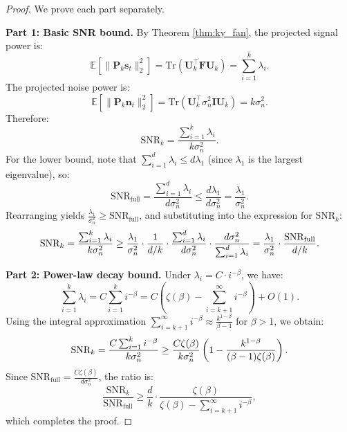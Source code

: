 ﻿\documentclass[lettersize,journal]{IEEEtran}
\begin{document}
\begin{proof}
We prove each part separately.

\textbf{Part 1: Basic SNR bound.} By Theorem \ref{thm:ky_fan}, the projected signal power is:
\begin{equation}
\mathbb{E}\left[\|\mathbf{P}_k \mathbf{s}_t\|_2^2\right] = \text{Tr}(\mathbf{U}_k^\top \mathbf{F} \mathbf{U}_k) = \sum_{i=1}^{k} \lambda_i.
\end{equation}
The projected noise power is:
\begin{equation}
\mathbb{E}\left[\|\mathbf{P}_k \mathbf{n}_t\|_2^2\right] = \text{Tr}(\mathbf{U}_k^\top \sigma_n^2 \mathbf{I} \mathbf{U}_k) = k \sigma_n^2.
\end{equation}
Therefore:
\begin{equation}
\text{SNR}_k = \frac{\sum_{i=1}^{k} \lambda_i}{k \sigma_n^2}.
\end{equation}
For the lower bound, note that $\sum_{i=1}^{d} \lambda_i \leq d \lambda_1$ (since $\lambda_1$ is the largest eigenvalue), so:
\begin{equation}
\text{SNR}_{\text{full}} = \frac{\sum_{i=1}^{d} \lambda_i}{d \sigma_n^2} \leq \frac{d \lambda_1}{d \sigma_n^2} = \frac{\lambda_1}{\sigma_n^2}.
\end{equation}
Rearranging yields $\frac{\lambda_1}{\sigma_n^2} \geq \text{SNR}_{\text{full}}$, and substituting into the expression for $\text{SNR}_k$:
\begin{equation}
\text{SNR}_k = \frac{\sum_{i=1}^{k} \lambda_i}{k \sigma_n^2} \geq \frac{\lambda_1}{\sigma_n^2} \cdot \frac{1}{d/k} \\\\
\cdot \frac{\sum_{i=1}^{d} \lambda_i}{d \sigma_n^2} \cdot \frac{d \sigma_n^2}{\sum_{i=1}^{d} \lambda_i} = \frac{\lambda_1}{\sigma_n^2} \cdot \frac{\text{SNR}_{\text{full}}}{d/k}.
\end{equation}

\textbf{Part 2: Power-law decay bound.} Under $\lambda_i = C \cdot i^{-\beta}$, we have:
\begin{equation}
\sum_{i=1}^{k} \lambda_i = C \sum_{i=1}^{k} i^{-\beta} = C (\zeta(\beta) - \sum_{i=k+1}^{\infty} i^{-\beta}) + O(1).
\end{equation}
Using the integral approximation $\sum_{i=k+1}^{\infty} i^{-\beta} \approx \frac{k^{1-\beta}}{\beta - 1}$ for $\beta > 1$, we obtain:
\begin{equation}
\text{SNR}_k = \frac{C \sum_{i=1}^{k} i^{-\beta}}{k \sigma_n^2} \\\\
\geq \frac{C \zeta(\beta)}{k \sigma_n^2} \left(1 - \frac{k^{1-\beta}}{(\beta - 1)\zeta(\beta)}\right).
\end{equation}
Since $\text{SNR}_{\text{full}} = \frac{C \zeta(\beta)}{d \sigma_n^2}$, the ratio is:
\begin{equation}
\frac{\text{SNR}_k}{\text{SNR}_{\text{full}}} \geq \frac{d}{k} \cdot \frac{\zeta(\beta)}{\zeta(\beta) - \sum_{i=k+1}^{\infty} i^{-\beta}},
\end{equation}
which completes the proof.
\end{proof}
\end{document}
